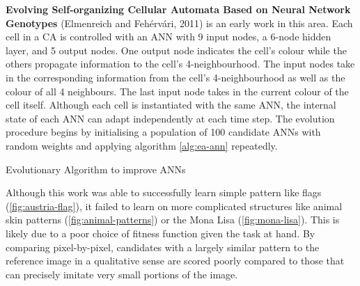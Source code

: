 \noindent
\textbf{Evolving Self-organizing Cellular Automata Based on Neural Network Genotypes} (Elmenreich and Feh\'erv\'ari, 2011) \cite{elmenreich2011evolving} is an early work in this area.
Each cell in a CA is controlled with an ANN with 9 input nodes, a 6-node hidden layer, and 5 output nodes.
One output node indicates the cell's colour while the others propagate information to the cell's 4-neighbourhood.
The input nodes take in the corresponding information from the cell's 4-neighbourhood as well as the colour of all 4 neighbours.
The last input node takes in the current colour of the cell itself.
Although each cell is instantiated with the same ANN, the internal state of each ANN can adapt independently at each time step.
The evolution procedure begins by initialising a population of 100 candidate ANNs with random weights and applying algorithm \ref{alg:ea-ann} repeatedly. 
\begin{algorithm}
\caption{Evolutionary Algorithm to improve ANNs}
\label{alg:ea-ann}
\begin{algorithmic}
\EndFor
{}
\EndFor
\end{algorithmic}
\end{algorithm}

Although this work was able to successfully learn simple pattern like flags (\ref{fig:austria-flag}), it failed to learn on more complicated structures like animal skin patterns (\ref{fig:animal-patterns}) or the Mona Lisa (\ref{fig:mona-lisa}).
This is likely due to a poor choice of fitness function given the task at hand.
By comparing pixel-by-pixel, candidates with a largely similar pattern to the reference image in a qualitative sense are scored poorly compared to those that can precisely imitate very small portions of the image.\\

